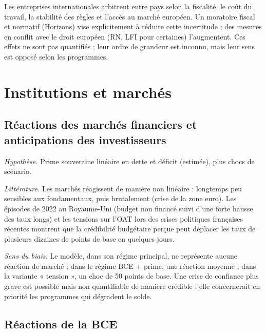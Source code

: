 \documentclass[
  11pt,
  11pt,
  a4paper,
  openany]{book}
\begin{document}
Les entreprises internationales arbitrent entre pays selon la fiscalité,
le coût du travail, la stabilité des règles et l'accès au marché
européen. Un moratoire fiscal et normatif (Horizons) vise explicitement
à réduire cette incertitude ; des mesures en conflit avec le droit
européen (RN, LFI pour certaines) l'augmentent. Ces effets ne sont pas
quantifiés ; leur ordre de grandeur est inconnu, mais leur sens est
opposé selon les programmes.

\hypertarget{institutions-et-marchuxe9s}{%
\section{Institutions et marchés}\label{institutions-et-marchuxe9s}}

\hypertarget{ruxe9actions-des-marchuxe9s-financiers-et-anticipations-des-investisseurs}{%
\subsection{Réactions des marchés financiers et anticipations des
investisseurs}\label{ruxe9actions-des-marchuxe9s-financiers-et-anticipations-des-investisseurs}}

\emph{Hypothèse.} Prime souveraine linéaire en dette et déficit
(estimée), plus chocs de scénario.

\emph{Littérature.} Les marchés réagissent de manière non linéaire :
longtemps peu sensibles aux fondamentaux, puis brutalement (crise de la
zone euro). Les épisodes de 2022 au Royaume-Uni (budget non financé
suivi d'une forte hausse des taux longs) et les tensions sur l'OAT lors
des crises politiques françaises récentes montrent que la crédibilité
budgétaire perçue peut déplacer les taux de plusieurs dizaines de points
de base en quelques jours.

\emph{Sens du biais.} Le modèle, dans son régime principal, ne
représente aucune réaction de marché ; dans le régime BCE + prime, une
réaction moyenne ; dans la variante « tension », un choc de 50 points de
base. Une crise de confiance plus grave est possible mais non
quantifiable de manière crédible ; elle concernerait en priorité les
programmes qui dégradent le solde.

\hypertarget{ruxe9actions-de-la-bce}{%
\subsection{Réactions de la BCE}\label{ruxe9actions-de-la-bce}}
\end{document}
